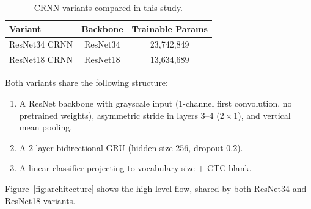 \documentclass[conference]{IEEEtran}
\begin{document}
\begin{table}[htbp]
\centering
\caption{CRNN variants compared in this study.}
\label{tab:variants}
\begin{tabular}{@{}lcc@{}}
\toprule
\textbf{Variant} & \textbf{Backbone} & \textbf{Trainable Params} \\
\midrule
ResNet34 CRNN    & ResNet34 & 23,742,849 \\
ResNet18 CRNN    & ResNet18 & 13,634,689 \\
\bottomrule
\end{tabular}
\end{table}

Both variants share the following structure:
\begin{enumerate}
  \item A ResNet backbone with grayscale input (1-channel first convolution,
        no pretrained weights), asymmetric stride in layers 3--4 ($2\times1$),
        and vertical mean pooling.
  \item A 2-layer bidirectional GRU (hidden size 256, dropout 0.2).
  \item A linear classifier projecting to vocabulary size $+$ CTC blank.
\end{enumerate}

\noindent{}Figure~\ref{fig:architecture} shows the high-level flow, shared by both
ResNet34 and ResNet18 variants.
\end{document}
